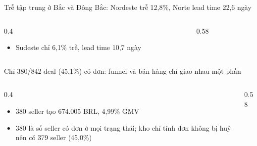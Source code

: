 \begin{frame}{Trễ tập trung ở Bắc và Đông Bắc: Nordeste trễ 12,8\%, Norte lead time 22,6 ngày}
\begin{columns}[T]\begin{column}{0.4\textwidth}
\begin{itemize}
  \item Sudeste chỉ 6,1\% trễ, lead time 10,7 ngày
\end{itemize}
\end{column}\begin{column}{0.58\textwidth}
\begin{center}\end{center}
\end{column}\end{columns}

\end{frame}

\begin{frame}{Chỉ 380/842 deal (45,1\%) có đơn: funnel và bán hàng chỉ giao nhau một phần}
\begin{columns}[T]\begin{column}{0.4\textwidth}
\begin{itemize}
  \item 380 seller tạo 674.005 BRL, 4,99\% GMV
  \item 380 là số seller có đơn ở mọi trạng thái; kho chỉ tính đơn không bị huỷ nên có 379 seller (45,0\%)
\end{itemize}
\end{column}\begin{column}{0.58\textwidth}
\begin{center}\end{center}
\end{column}\end{columns}

\end{frame}

